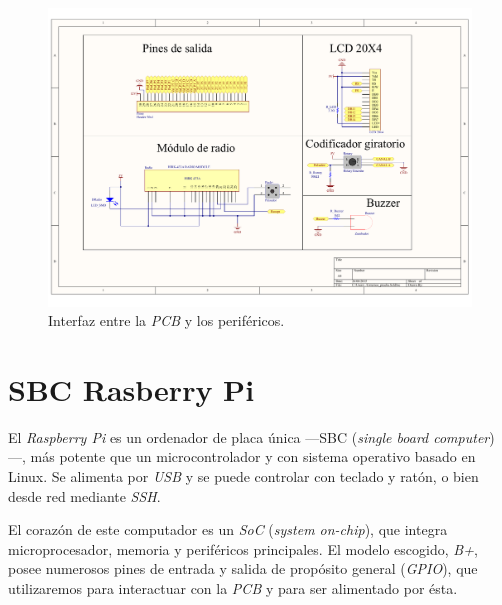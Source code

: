 \begin{figure}[H]
	\noindent \begin{centering}
		\includegraphics[width=\linewidth*2/3]{capitulo3/pcb_perifericos}
		\par\end{centering}
	\smallskip
	\caption{\label{fig:pcb_perifericos} Interfaz entre la \textit{PCB} y los periféricos.}
\end{figure} 

\smallskip

\section{SBC Rasberry Pi}

El \textit{Raspberry Pi} es un ordenador de placa única ---SBC (\textit{single board computer})---, más potente que un microcontrolador y con sistema operativo basado en Linux. Se alimenta por \textit{USB} y se puede controlar con teclado y ratón, o bien desde red mediante \textit{SSH}. 

El corazón de este computador es un \textit{SoC} (\textit{system on-chip}), que integra microprocesador, memoria y periféricos principales. El modelo escogido, \textit{B+}, posee numerosos pines de entrada y salida de propósito general (\textit{GPIO}), que utilizaremos para interactuar con la \textit{PCB} y para ser alimentado por ésta.

\smallskip


